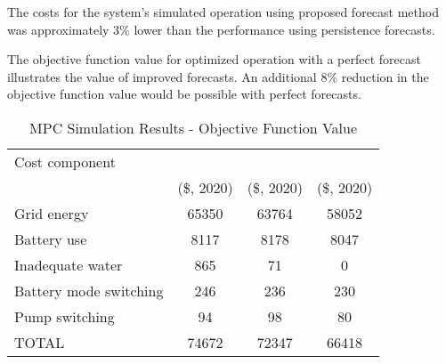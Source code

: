 The costs for the system's simulated operation using proposed forecast method was approximately
3\% lower than the performance using persistence forecasts.

The objective function value for optimized operation with a perfect forecast illustrates the value of improved forecasts.
An additional 8\% reduction in the objective function value would be possible with perfect forecasts.

\begin{table}[!htb]
	\caption{MPC Simulation Results - Objective Function Value}
	\label{table:mpc-simulation-results}
	\centering
	\setlength\tabcolsep{0.6mm}
	\begin{tabular}{lS[table-format=5]S[table-format=5]S[table-format=5]}
		\toprule
		  Cost component
          & {} & {} & {} \\
		  & {(\$, 2020)} & {(\$, 2020)}                    & {(\$, 2020)} \\
		\midrule
		Grid energy            & 65350 & 63764 & 58052 \\
		Battery use            &  8117 &  8178 &  8047 \\
		Inadequate water       &   865 &    71 &     0 \\
		Battery mode switching &   246 &   236 &   230 \\
		Pump switching         &    94 &    98 &    80 \\
		\midrule
		TOTAL                       & 74672 & 72347 & 66418 \\
		\bottomrule
	\end{tabular}
\end{table}

